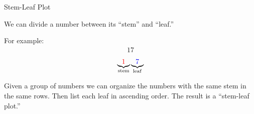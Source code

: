 \begin{frame}{Stem-Leaf Plot}

  We can divide a number between its ``stem'' and ``leaf.''

  For example:
  {
    \begin{eqnarray*}
      17
    \end{eqnarray*}
  }
  {
    \begin{eqnarray*}
      \underbrace{\color{red}1}_{\mathrm{stem}}\underbrace{\color{blue}7}_{\mathrm{leaf}}
    \end{eqnarray*}
  }

  {
    Given a group of numbers we can organize the numbers with the same
    stem in the same rows. Then list each leaf in ascending order. The
    result is a ``stem-leaf plot.''
  }
  
  
\end{frame}

